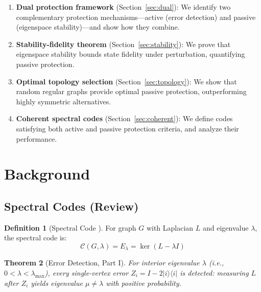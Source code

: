 \documentclass[11pt,a4paper]{article}
\newtheorem{theorem}{Theorem}[section]
\theoremstyle{definition}
\newtheorem{definition}[theorem]{Definition}
\newcommand{\codespace}{\mathcal{C}}
\newcommand{\ketbra}[2]{|#1\rangle\!\langle#2|}
\begin{document}
\begin{enumerate}
    \item \textbf{Dual protection framework} (Section~\ref{sec:dual}): We identify two complementary protection mechanisms---active (error detection) and passive (eigenspace stability)---and show how they combine.
    
    \item \textbf{Stability-fidelity theorem} (Section~\ref{sec:stability}): We prove that eigenspace stability bounds state fidelity under perturbation, quantifying passive protection.
    
    \item \textbf{Optimal topology selection} (Section~\ref{sec:topology}): We show that random regular graphs provide optimal passive protection, outperforming highly symmetric alternatives.
    
    \item \textbf{Coherent spectral codes} (Section~\ref{sec:coherent}): We define codes satisfying both active and passive protection criteria, and analyze their performance.
\end{enumerate}

\section{Background}
\label{sec:background}

\subsection{Spectral Codes (Review)}

\begin{definition}[Spectral Code \cite{benshalom2026spectral}]
For graph $G$ with Laplacian $L$ and eigenvalue $\lambda$, the spectral code is:
\begin{equation}
    \codespace(G, \lambda) = E_\lambda = \ker(L - \lambda I)
\end{equation}
\end{definition}

\begin{theorem}[Error Detection, Part I]
\label{thm:detection_review}
For interior eigenvalue $\lambda$ (i.e., $0 < \lambda < \lambda_{\max}$), every single-vertex error $Z_i = I - 2\ketbra{i}{i}$ is detected: measuring $L$ after $Z_i$ yields eigenvalue $\mu \neq \lambda$ with positive probability.
\end{theorem}
\end{document}

